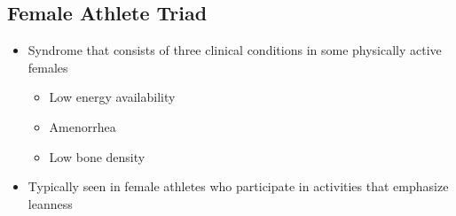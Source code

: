 \documentclass[title={Chapter 11}]{fdsn201notes}
\begin{document}
\subsection{Female Athlete Triad}\label{subsec:female-athlete-triad}
\begin{itemize}
	\item Syndrome that consists of three clinical conditions in some physically active females
	\begin{itemize}
		\item Low energy availability
		\item Amenorrhea
		\item Low bone density
	\end{itemize}
	\item Typically seen in female athletes who participate in activities that emphasize leanness
\end{itemize}
\end{document}
